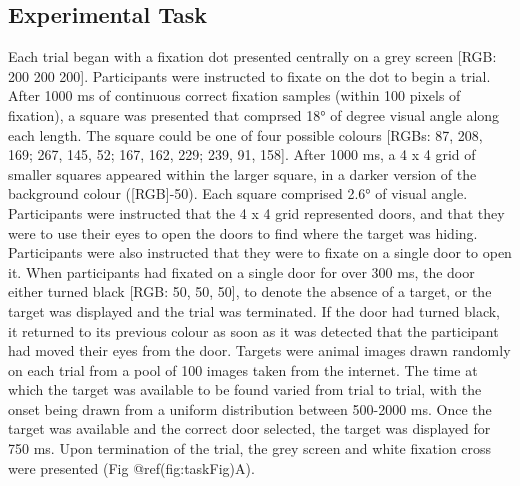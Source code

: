 \documentclass{article}
\begin{document}
\hypertarget{experimental-task}{%
\subsection{Experimental Task}\label{experimental-task}}

Each trial began with a fixation dot presented centrally on a grey
screen {[}RGB: 200 200 200{]}. Participants were instructed to fixate on
the dot to begin a trial. After 1000 ms of continuous correct fixation
samples (within 100 pixels of fixation), a square was presented that
comprsed 18° of degree visual angle along each length. The square could
be one of four possible colours {[}RGBs: 87, 208, 169; 267, 145, 52;
167, 162, 229; 239, 91, 158{]}. After 1000 ms, a 4 x 4 grid of smaller
squares appeared within the larger square, in a darker version of the
background colour ({[}RGB{]}-50). Each square comprised 2.6° of visual
angle. Participants were instructed that the 4 x 4 grid represented
doors, and that they were to use their eyes to open the doors to find
where the target was hiding. Participants were also instructed that they
were to fixate on a single door to open it. When participants had
fixated on a single door for over 300 ms, the door either turned black
{[}RGB: 50, 50, 50{]}, to denote the absence of a target, or the target
was displayed and the trial was terminated. If the door had turned
black, it returned to its previous colour as soon as it was detected
that the participant had moved their eyes from the door. Targets were
animal images drawn randomly on each trial from a pool of 100 images
taken from the internet. The time at which the target was available to
be found varied from trial to trial, with the onset being drawn from a
uniform distribution between 500-2000 ms. Once the target was available
and the correct door selected, the target was displayed for 750 ms. Upon
termination of the trial, the grey screen and white fixation cross were
presented (Fig @ref(fig:taskFig)A).
\end{document}
